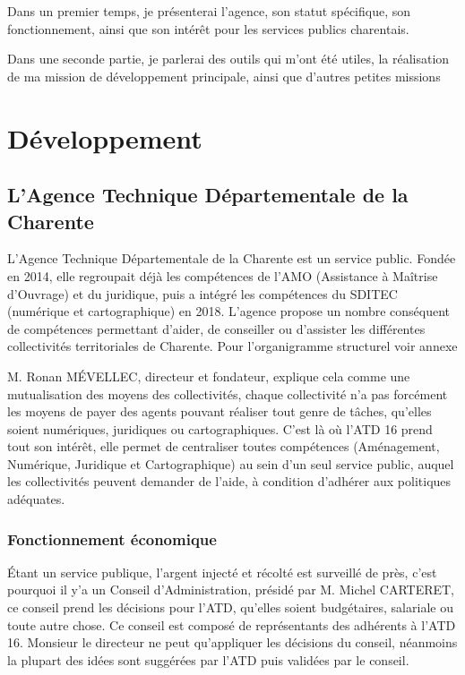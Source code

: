 \documentclass[a4paper,12pt]{report}
\begin{document}
\vspace{1em}

Dans un premier temps, je présenterai l'agence, son statut spécifique, son fonctionnement, ainsi que son intérêt pour les services publics charentais.


Dans une seconde partie, je parlerai des outils qui m'ont été utiles, la réalisation de ma mission de développement principale, ainsi que d'autres petites missions

\chapter{Développement}

\section{L'Agence Technique Départementale de la Charente}
L'Agence Technique Départementale de la Charente est un service public. Fondée en 2014, elle regroupait déjà les compétences de l'AMO (Assistance à Maîtrise d'Ouvrage) et du juridique, puis  a intégré les compétences du SDITEC (numérique et cartographique) en 2018. L'agence propose un nombre conséquent de compétences permettant d'aider, de conseiller ou d'assister les différentes collectivités territoriales de Charente. Pour l'organigramme structurel voir annexe


M. Ronan MÉVELLEC, directeur et fondateur, explique cela comme une mutualisation des moyens des collectivités, chaque collectivité n'a pas forcément les moyens de payer des agents pouvant réaliser tout genre de tâches, qu'elles soient numériques, juridiques ou cartographiques. C'est là où l'ATD 16 prend tout son intérêt, elle permet de centraliser toutes compétences (Aménagement, Numérique, Juridique et Cartographique) au sein d'un seul service public, auquel les collectivités peuvent demander de l'aide, à condition d'adhérer aux politiques adéquates.

\subsection{Fonctionnement économique}

Étant un service publique, l'argent injecté et récolté est surveillé de près, c'est pourquoi il y'a un Conseil d'Administration, présidé par M. Michel CARTERET, ce conseil prend les décisions pour l'ATD, qu'elles soient budgétaires, salariale ou toute autre chose. Ce conseil est composé de représentants des adhérents à l'ATD 16. Monsieur le directeur ne peut qu'appliquer les décisions du conseil, néanmoins la plupart des idées sont suggérées par l'ATD puis validées par le conseil.
\end{document}
